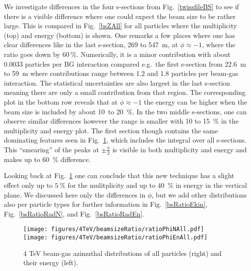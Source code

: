We investigate differences in the four s-sections from Fig.~\ref{twissfileBS} to see if there is a visible difference where one could expect the beam size to be rather large. This is compared in Fig.~\ref{bsZAll} for all particles where the multiplicity (top) and energy (bottom) is shown. One remarks a few places where one has clear differences like in the last s-section, 269 to 547~m, at $\phi \approx -1$, where the ratio goes down by $60~\%$. Numerically, it is a minor contribution with about 0.0033 particles per BG interaction compared e.g.~the first s-section from 22.6~m to 59~m where contributions range between 1.2 and 1.8 particles per beam-gas interaction. The statistical uncertainties are also largest in the last s-section meaning there are only a small contribution from that region. The corresponding plot in the bottom row reveals that at $\phi \approx -1$ the energy can be higher when the beam size is included by about 10~to 20~$\%$.
In the two middle s-sections, one can observe similar differences however the range is smaller with 10 to 15~$\%$ in the multiplicity and energy plot. The first section though contains the same dominating features seen in Fig.~\ref{bsRatioPhiAll}, which includes the integral over all s-sections. This ``smearing'' of the peaks at $\pm \frac{\pi}{2}$ is visible in both multiplicity and energy and makes up to 60~$\%$ difference.

Looking back at Fig.~\ref{bsRatioPhiAll} one can conclude that this new technique has a slight effect only up to $5~\%$ for the mulitplicity and up to 40~$\%$ in energy in the vertical plane. We discussed here only the differences in $\phi$, but we add other distributions also per particle types for further information in Fig.~\ref{bsRatioEkin}, Fig.~\ref{bsRatioRadN}, and Fig.~\ref{bsRatioRadEn}.

\begin{figure}%
\begin{center}
  \texttt{[image: figures/4TeV/beamsizeRatio/ratioPhiNAll.pdf]}
  \texttt{[image: figures/4TeV/beamsizeRatio/ratioPhiEnAll.pdf]}
\end{center}
\vspace{-0.6cm}
 \caption{4 TeV beam-gas azimuthal distributions of all particles (right) and their energy (left).
  \label{bsRatioPhiAll}} 
\end{figure}


